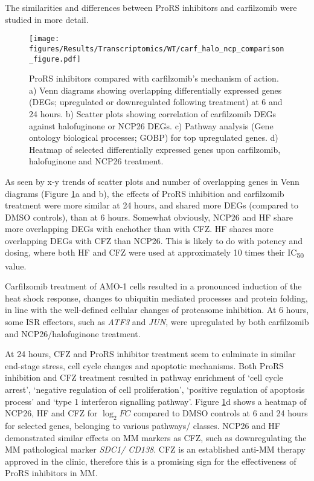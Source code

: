 The similarities and differences between ProRS inhibitors and carfilzomib were studied in more detail.
\begin{figure}[p]
\centering
\texttt{[image: figures/Results/Transcriptomics/WT/carf\_halo\_ncp\_comparison\_figure.pdf]}
\caption[ProRS inhibitors vs carfilzomib- WT cells]{ProRS inhibitors compared with carfilzomib's mechanism of action.
a) Venn diagrams showing overlapping differentially expressed genes (DEGs; upregulated or downregulated following treatment) at 6 and 24 hours.
b) Scatter plots showing correlation of carfilzomib DEGs against halofuginone or NCP26 DEGs.
c) Pathway analysis (Gene ontology biological processes; GOBP) for top upregulated genes.
d) Heatmap of selected differentially expressed genes upon carfilzomib, halofuginone and NCP26 treatment.
}
\label{fig:wt_carf_compare}
\end{figure}
As seen by x-y trends of scatter plots and number of overlapping genes in Venn diagrams (Figure \ref{fig:wt_carf_compare}a and b), the effects of ProRS inhibition and carfilzomib treatment were more similar at 24 hours, and shared more DEGs (compared to DMSO controls), than at 6 hours.
Somewhat obviously, NCP26 and HF share more overlapping DEGs with eachother than with CFZ\@.
HF shares more overlapping DEGs with CFZ than NCP26.
This is likely to do with potency and dosing, where both HF and CFZ were used at approximately 10 times their IC\textsubscript{50} value.

Carfilzomib treatment of AMO-1 cells resulted in a pronounced induction of the heat shock response, changes to ubiquitin mediated processes and protein folding, in line with the well-defined cellular changes of proteasome inhibition.
At 6 hours, some ISR effectors, such as \textit{ATF3} and \textit{JUN}, were upregulated by both carfilzomib and NCP26/halofuginone treatment.

At 24 hours, CFZ and ProRS inhibitor treatment seem to culminate in similar end-stage stress, cell cycle changes and apoptotic mechanisms.
Both ProRS inhibition and CFZ treatment resulted in pathway enrichment of `cell cycle arrest', `negative regulation of cell proliferation', `positive regulation of apoptosis process' and `type 1 interferon signalling pathway'.
Figure \ref{fig:wt_carf_compare}d shows a heatmap of NCP26, HF and CFZ for $\log_{2}FC$ compared to DMSO controls at 6 and 24 hours for selected genes, belonging to various pathways/ classes.
NCP26 and HF demonstrated similar effects on MM markers as CFZ, such as downregulating the MM pathological marker \textit{SDC1/ CD138}.
CFZ is an established anti-MM therapy approved in the clinic, therefore this is a promising sign for the effectiveness of ProRS inhibitors in MM\@.


